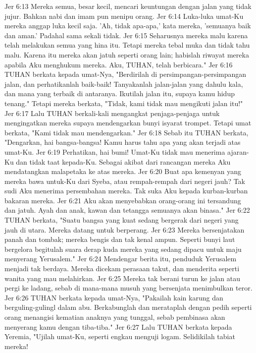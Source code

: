 Jer 6:13  Mereka semua, besar kecil, mencari keuntungan dengan jalan yang tidak jujur. Bahkan nabi dan imam pun menipu orang.
Jer 6:14  Luka-luka umat-Ku mereka anggap luka kecil saja. 'Ah, tidak apa-apa,' kata mereka, 'semuanya baik dan aman.' Padahal sama sekali tidak.
Jer 6:15  Seharusnya mereka malu karena telah melakukan semua yang hina itu. Tetapi mereka tebal muka dan tidak tahu malu. Karena itu mereka akan jatuh seperti orang lain; habislah riwayat mereka apabila Aku menghukum mereka. Aku, TUHAN, telah berbicara."
Jer 6:16  TUHAN berkata kepada umat-Nya, "Berdirilah di persimpangan-persimpangan jalan, dan perhatikanlah baik-baik! Tanyakanlah jalan-jalan yang dahulu kala, dan mana yang terbaik di antaranya. Ikutilah jalan itu, supaya kamu hidup tenang." Tetapi mereka berkata, "Tidak, kami tidak mau mengikuti jalan itu!"
Jer 6:17  Lalu TUHAN berkali-kali mengangkat penjaga-penjaga untuk mengingatkan mereka supaya mendengarkan bunyi isyarat trompet. Tetapi umat berkata, "Kami tidak mau mendengarkan."
Jer 6:18  Sebab itu TUHAN berkata, "Dengarkan, hai bangsa-bangsa! Kamu harus tahu apa yang akan terjadi atas umat-Ku.
Jer 6:19  Perhatikan, hai bumi! Umat-Ku tidak mau menerima ajaran-Ku dan tidak taat kepada-Ku. Sebagai akibat dari rancangan mereka Aku mendatangkan malapetaka ke atas mereka.
Jer 6:20  Buat apa kemenyan yang mereka bawa untuk-Ku dari Syeba, atau rempah-rempah dari negeri jauh? Tak sudi Aku menerima persembahan mereka. Tak suka Aku kepada kurban-kurban bakaran mereka.
Jer 6:21  Aku akan menyebabkan orang-orang ini tersandung dan jatuh. Ayah dan anak, kawan dan tetangga semuanya akan binasa."
Jer 6:22  TUHAN berkata, "Suatu bangsa yang kuat sedang bergerak dari negeri yang jauh di utara. Mereka datang untuk berperang.
Jer 6:23  Mereka bersenjatakan panah dan tombak; mereka bengis dan tak kenal ampun. Seperti bunyi laut bergelora begitulah suara derap kuda mereka yang sedang dipacu untuk maju menyerang Yerusalem."
Jer 6:24  Mendengar berita itu, penduduk Yerusalem menjadi tak berdaya. Mereka dicekam perasaan takut, dan menderita seperti wanita yang mau melahirkan.
Jer 6:25  Mereka tak berani turun ke jalan atau pergi ke ladang, sebab di mana-mana musuh yang bersenjata menimbulkan teror.
Jer 6:26  TUHAN berkata kepada umat-Nya, "Pakailah kain karung dan berguling-gulingl dalam abu. Berkabunglah dan merataplah dengan pedih seperti orang menangisi kematian anaknya yang tunggal, sebab pembinasa akan menyerang kamu dengan tiba-tiba."
Jer 6:27  Lalu TUHAN berkata kepada Yeremia, "Ujilah umat-Ku, seperti engkau menguji logam. Selidikilah tabiat mereka!
